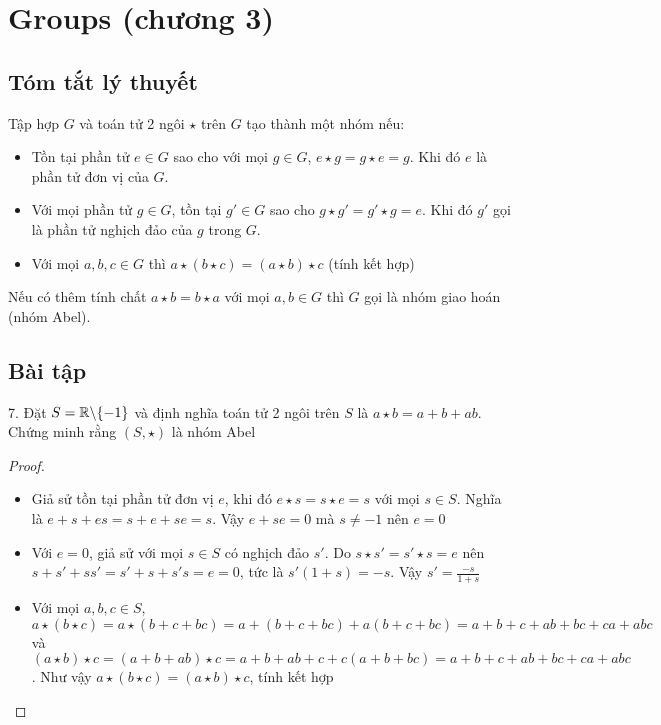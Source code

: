 \section{Groups (chương 3)}

\subsection{Tóm tắt lý thuyết}

Tập hợp $G$ và toán tử 2 ngôi $\star$ trên $G$ tạo thành một nhóm nếu:

\begin{itemize}
    \item Tồn tại phần tử $e \in G$ sao cho với mọi $g \in G$, $e \star g = g \star e = g$. Khi đó $e$ là phần tử đơn vị của $G$.
    \item Với mọi phần tử $g \in G$, tồn tại $g' \in G$ sao cho $g \star g' = g' \star g = e$. Khi đó $g'$ gọi là phần tử nghịch đảo của $g$ trong $G$.
    \item Với mọi $a, b, c \in G$ thì $a \star (b \star c) = (a \star b) \star c$ (tính kết hợp)
\end{itemize}

Nếu có thêm tính chất $a \star b = b \star a$ với mọi $a, b \in G$ thì $G$ gọi là nhóm giao hoán (nhóm Abel).

\subsection{Bài tập}

7. Đặt $S = \mathbb{R} \backslash \{-1\}$ và định nghĩa toán tử 2 ngôi trên $S$ là $a \star b = a + b + ab$. Chứng minh rằng $(S, \star)$ là nhóm Abel

\begin{proof}
    \begin{itemize}
        \item Giả sử tồn tại phần tử đơn vị $e$, khi đó $e \star s = s \star e = s$ với mọi $s \in S$. Nghĩa là $e + s + es = s + e + se = s$. Vậy $e + se = 0$ mà $s \neq -1$ nên $e = 0$
        \item Với $e = 0$, giả sử với mọi $s \in S$ có nghịch đảo $s'$. Do $s \star s' = s' \star s = e$ nên $s + s' + ss' = s' + s + s's = e = 0$, tức là $s'(1 + s) = -s$. Vậy $s' = \frac{-s}{1 + s}$
        \item Với mọi $a, b, c \in S$, $a \star (b \star c) = a \star (b + c + bc) = a + (b+c+bc) + a (b+c+bc) = a + b + c + ab + bc + ca + abc$ và $(a \star b) \star c = (a + b + ab) \star c = a + b + ab + c + c(a+b+bc) = a + b + c + ab + bc + ca + abc$. Như vậy $a \star (b \star c) = (a \star b) \star c$, tính kết hợp
    \end{itemize}
\end{proof}

